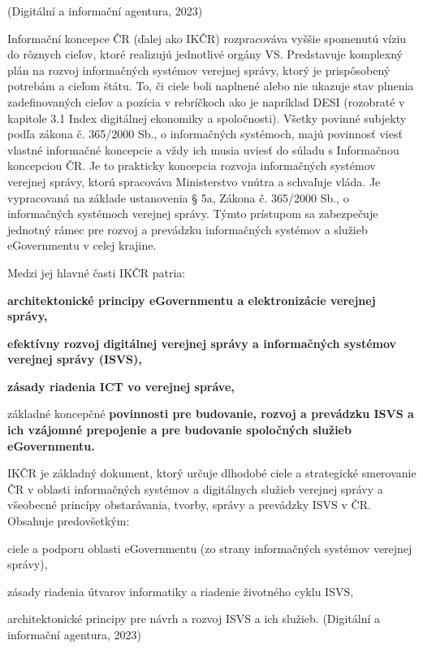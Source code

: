  \scr(Digitální a informační agentura, 2023)

Informační koncepce ČR (ďalej ako IKČR) rozpracováva vyššie spomenutú víziu do rôznych cieľov, ktoré realizujú jednotlivé orgány VS. Predstavuje komplexný plán na rozvoj informačných systémov verejnej správy, ktorý je prispôsobený potrebám a cieľom štátu. To, či ciele boli naplnené alebo nie ukazuje stav plnenia zadefinovaných cieľov a pozícia v rebríčkoch ako je napríklad DESI (rozobraté v kapitole 3.1 Index digitálnej ekonomiky a spoločnosti). Všetky povinné subjekty podľa zákona  č. 365/2000 Sb., o informačných systémoch, majú povinnosť viesť vlastné informačné koncepcie a vždy ich musia uviesť do súladu s Informačnou koncepciou ČR. Je to prakticky koncepcia rozvoja informačných systémov verejnej správy, ktorú spracováva Ministerstvo vnútra a schvaľuje vláda. Je vypracovaná na základe ustanovenia § 5a, Zákona č. 365/2000 Sb., o informačných systémoch verejnej správy. Týmto prístupom sa zabezpečuje jednotný rámec pre rozvoj a prevádzku informačných systémov a služieb eGovernmentu v celej krajine.

Medzi jej hlavné časti IKČR patria:

\startitemize
\item{\start\bf architektonické principy \stop eGovernmentu a elektronizácie verejnej správy,}
\item{\start \bf efektívny rozvoj \stop digitálnej verejnej správy a informačných systémov verejnej správy (ISVS),}
\item{\start\bf zásady \stop riadenia ICT vo verejnej správe,}
\item{základné koncepčné \start \bf povinnosti \stop pre budovanie, rozvoj a prevádzku ISVS a ich vzájomné prepojenie a pre budovanie spoločných služieb eGovernmentu.}
\stopitemize

IKČR je základný dokument, ktorý určuje dlhodobé ciele a strategické smerovanie ČR v oblasti informačných systémov a digitálnych služieb verejnej správy a všeobecné princípy obstarávania, tvorby, správy a prevádzky ISVS v ČR. Obsahuje predovšetkým:
\startitemize
\item{ciele a podporu oblasti eGovernmentu (zo strany informačných systémov verejnej správy),}
\item{zásady riadenia útvarov informatiky a riadenie životného cyklu ISVS,}
\item{architektonické principy pre návrh a rozvoj ISVS a ich služieb. \scr(Digitální a informační agentura, 2023)}
\stopitemize

